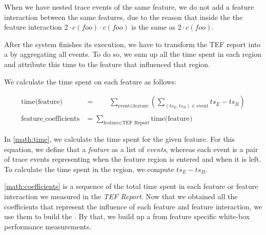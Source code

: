When we have nested trace events of the same feature, we do not add a feature interaction between the same features, 
due to the reason that inside the {\perfInfluenceModel} the feature interaction $2 \cdot c(foo) \cdot c(foo)$ is the same as $2 \cdot c(foo)$.

After the system finishes its execution, we have to transform the TEF report into a {\perfInfluenceModel} by aggregating all events. 
To do so, we sum up all the time spent in each region and attribute this time to the feature that influenced that region. 

We calculate the time spent on each feature as follows:


\begin{align}
    \text{time(feature)} &= \textit{ }\textit{ }\textit{ } \sum_{\text{event} \in \text{feature}} \left( \sum_{(ts_E, ts_B) \in \text{event}} ts_E - ts_B \right) \label{math:time} \\ \nonumber \\
    \text{feature\_coefficients} &= \sum_{\text{feature} \in \text{TEF Report}}\text{time(feature)} \label{math:coefficients}
\end{align}

In \autoref{math:time}, we calculate the time spent for the given feature. 
For this equation, we define that a \textit{feature} as a list of \textit{events}, 
whereas each event is a pair of trace events representing when the feature region is entered and when it is left. 
To calculate the time spent in the region, we compute $ts_E - ts_B$.

\autoref{math:coefficients} is a sequence of the total time spent in each feature or feature interaction we measured in the \textit{TEF Report}. 
Now that we obtained all the coefficients that represent the influence of each feature and feature interaction, we use them to build the \perfInfluenceModel.
By that, we build up a {\perfInfluenceModel} from feature specific white-box performance measurements.

